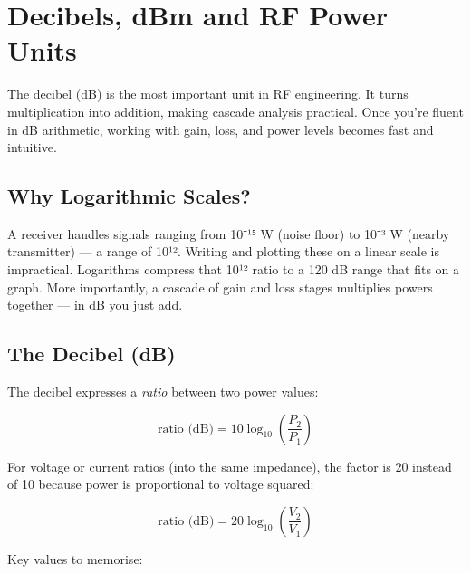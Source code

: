 \section{Decibels, dBm and RF Power Units}\label{sec:wiki_db_dbm}



The decibel (dB) is the most important unit in RF engineering. It turns multiplication into addition, making cascade analysis practical. Once you're fluent in dB arithmetic, working with gain, loss, and power levels becomes fast and intuitive.

      

\subsection{Why Logarithmic Scales?}

      

A receiver handles signals ranging from 10⁻¹⁵ W (noise floor) to 10⁻³ W (nearby transmitter) — a range of 10¹². Writing and plotting these on a linear scale is impractical. Logarithms compress that 10¹² ratio to a 120 dB range that fits on a graph. More importantly, a cascade of gain and loss stages multiplies powers together — in dB you just add.


      

\subsection{The Decibel (dB)}

      

The decibel expresses a \emph{ratio} between two power values:

      
\[\text{ratio (dB)} = 10\log_{10}\!\left(\dfrac{P_2}{P_1}\right)\]

      

For voltage or current ratios (into the same impedance), the factor is 20 instead of 10 because power is proportional to voltage squared:

      
\[\text{ratio (dB)} = 20\log_{10}\!\left(\dfrac{V_2}{V_1}\right)\]

      

Key values to memorise:

      
        
        
        
